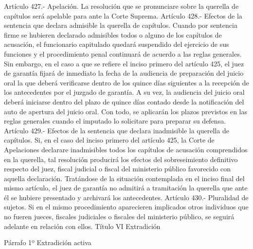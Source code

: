     Artículo 427.- Apelación. La resolución que se pronunciare sobre la querella de capítulos será apelable para ante la Corte Suprema.
    Artículo 428.- Efectos de la sentencia que declara admisible la querella de capítulos. Cuando por sentencia firme se hubieren declarado admisibles todos o alguno de los capítulos de acusación, el funcionario capitulado quedará suspendido del ejercicio de sus funciones y el procedimiento penal continuará de acuerdo a las reglas generales.
    Sin embargo, en el caso a que se refiere el inciso primero del artículo 425, el juez de garantía fijará de inmediato la fecha de la audiencia de preparación del juicio oral la que deberá verificarse dentro de los quince días siguientes a la recepción de los antecedentes por el juzgado de garantía. A su vez, la audiencia del juicio oral deberá iniciarse dentro del plazo de quince días contado desde la notificación del auto de apertura del juicio oral. Con todo, se aplicarán los plazos previstos en las reglas generales cuando el imputado lo solicitare para preparar su defensa.
    Artículo 429.- Efectos de la sentencia que declara inadmisible la querella de capítulos. Si, en el caso del inciso primero del artículo 425, la Corte de Apelaciones declarare inadmisibles todos los capítulos de acusación comprendidos en la querella, tal resolución producirá los efectos del sobreseimiento definitivo respecto del juez, fiscal judicial o fiscal del ministerio público favorecido con aquella declaración.
    Tratándose de la situación contemplada en el inciso final del mismo artículo, el juez de garantía no admitirá a tramitación la querella que ante él se hubiere presentado y archivará los antecedentes.
    Artículo 430.- Pluralidad de sujetos. Si en el mismo procedimiento aparecieren implicados otros individuos que no fueren jueces, fiscales judiciales o fiscales del ministerio público, se seguirá adelante en relación con ellos.
    Título VI
    Extradición

    Párrafo 1º Extradición activa




